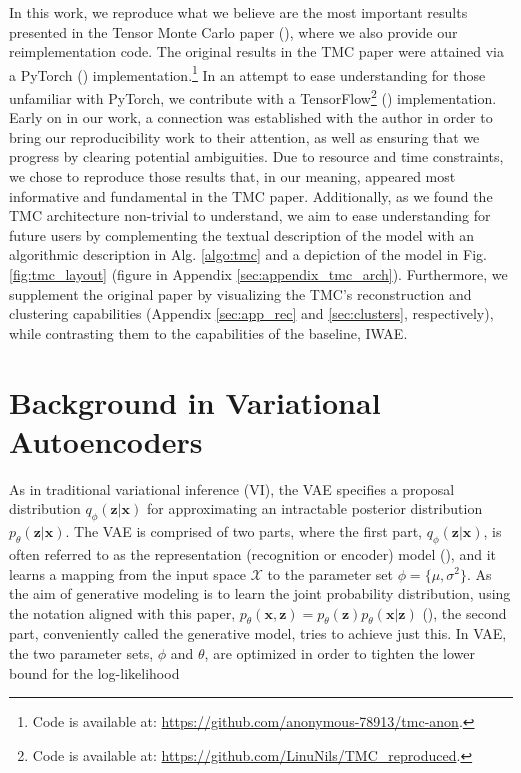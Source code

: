 In this work, we reproduce what we believe are the most important results presented in the Tensor Monte Carlo paper (\cite{tmc}), where we also provide our reimplementation code. The original results in the TMC paper were attained via a PyTorch (\cite{pytorch}) implementation.\footnote{Code is available at:   \url{https://github.com/anonymous-78913/tmc-anon}.} In an attempt to ease understanding for those unfamiliar with PyTorch, we contribute with a TensorFlow\footnote{Code is available at:
\url{https://github.com/LinuNils/TMC_reproduced}.} (\cite{tensorflow}) implementation. Early on in our work, a connection was established with the author in order to bring our reproducibility work to their attention, as well as ensuring that we progress by clearing potential ambiguities. Due to resource and time constraints, we chose to reproduce those results that, in our meaning, appeared most informative and fundamental in the TMC paper. Additionally, as we found the TMC architecture non-trivial to understand, we aim to ease understanding for future users by complementing the textual description of the model with an algorithmic description in Alg. \ref{algo:tmc} and a depiction of the model in Fig. \ref{fig:tmc_layout} (figure in Appendix \ref{sec:appendix_tmc_arch}). Furthermore, we supplement the original paper by visualizing the TMC's reconstruction and clustering capabilities (Appendix \ref{sec:app_rec} and \ref{sec:clusters}, respectively), while contrasting them to the capabilities of the baseline, IWAE.

\section{Background in Variational Autoencoders}
As in traditional variational inference (VI), the VAE specifies a proposal distribution $q_{\phi}(\bm z|\bm x)$ for approximating an intractable posterior distribution $p_{\theta}(\bm z|\bm x)$. The VAE is comprised of two parts, where the first part, $q_{\phi}(\bm z|\bm x)$, is often referred to as the representation (recognition or encoder) model (\cite{kingma2013autoencoding, tmc, iwae}), and it learns a mapping from the input space $\mathcal{X}$ to the parameter set $\phi = \{\mu, \sigma^2 \}$. As the aim of generative modeling is to learn the joint probability distribution, using the notation aligned with this paper, $p_{\theta}(\bm x, \bm z) = p_{\theta}(\bm z)p_{\theta}(\bm x| \bm z)$ (\cite{kingma2013autoencoding, kingma2018glow, kingma2019introduction}), the second part, conveniently called the generative model, tries to achieve just this. In VAE, the two parameter sets, $\phi$ and $\theta$, are optimized in order to tighten the lower bound for the log-likelihood

